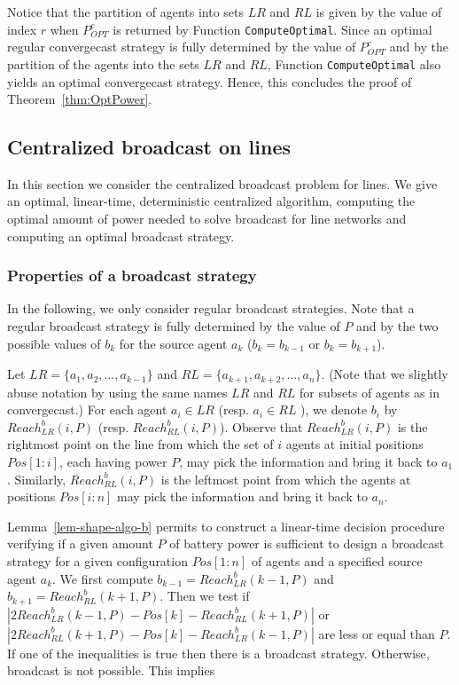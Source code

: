 \documentclass{article}
\newcommand\rblr{Reach_{LR}^b\xspace}
\newcommand\rbrl{Reach_{RL}^b\xspace}
\newcommand\CompOptimal{\mbox{{\tt ComputeOptimal}}\xspace}
\newcommand\broadcast{broadcast\xspace}
\newcommand\Cbcast{Centralized broadcast\xspace}
\begin{document}
Notice that the partition of agents into sets $LR$ and $RL$ is given by the value of index $r$ when $P_{OPT}^c$ is returned by Function
\CompOptimal.
Since an optimal regular convergecast strategy is fully determined by the value of $P_{OPT}^c$ and by the partition of the agents into the sets $LR$ and $RL$, Function \CompOptimal also yields an optimal convergecast strategy. Hence, this concludes the proof of Theorem~\ref{thm:OptPower}.
\vspace{-0.2cm}


\subsection{{\Cbcast} on lines}\label{s:line-b}

In this section we consider the centralized {\broadcast} problem
for lines. We give an optimal, linear-time, deterministic centralized
algorithm, computing the optimal amount of power needed to solve
{\broadcast} for line networks and computing an optimal broadcast strategy. 






\subsubsection{Properties of a {\broadcast} strategy}\label{sec-properties-b}

In the following, we only consider regular broadcast strategies. Note that a
regular broadcast strategy is fully determined by the value of $P$ and by 
the two possible values of $b_k$ for the source agent $a_k$ ($b_k=b_{k-1}$ or $b_k=b_{k+1}$). 

Let $LR = \{a_1,a_2,\hdots,a_{k-1}\}$ and $RL = \{a_{k+1}, a_{k+2},\hdots,a_n\}$. (Note that we slightly abuse notation by using the same names $LR$ and $RL$ for subsets of agents as in convergecast.)
For each agent $a_i\in LR$  (resp. $a_i\in RL$ ), we denote $b_i$ by
$\rblr(i,P)$ (resp. $\rbrl(i,P)$). Observe that
$\rblr(i,P)$ is the rightmost point on the line from which the set
of $i$ agents at initial positions $Pos[1:i]$, each having power $P$,
may pick the information and bring it back to $a_1$. Similarly,
$\rbrl(i,P)$ is the leftmost point from which the agents at positions
$Pos[i:n]$ may pick the information and bring it back to $a_n$.







Lemma~\ref{lem-shape-algo-b} permits to construct a linear-time decision
procedure verifying if a given amount $P$ of battery power is
sufficient to design a broadcast strategy for a given configuration
$Pos[1:n]$ of agents and a specified source agent $a_k$.  We first compute $b_{k-1}=\rblr(k-1,P)$ and $b_{k+1}=\rbrl(k+1,P)$. 
Then we test if $|2\rblr(k-1,P) - Pos[k] - \rbrl(k+1,P)|$ or  $|2\rbrl(k+1,P) - Pos[k] - \rblr(k-1,P)|$ are less or equal than $P$.
If one of the inequalities is true then there is a broadcast strategy. Otherwise, broadcast is not possible. This implies
\end{document}

